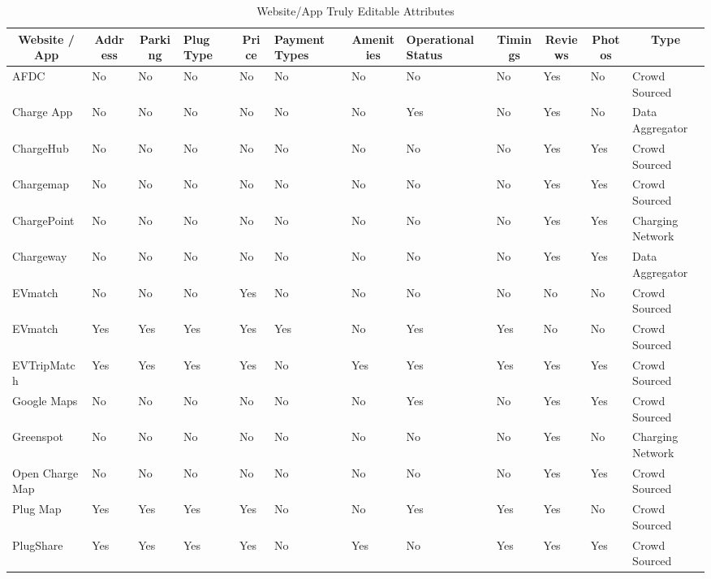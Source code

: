 \documentclass[conference]{IEEEtran}
\begin{document}
\begin{table}[htbp]
\caption{Website/App Truly Editable Attributes}
\begin{center}
\begin{tabular}{|l|l|l|l|l|l|l|l|l|l|l|l|}
\hline
\multicolumn{1}{|c|}{\textbf{Website / App}} & \multicolumn{1}{c|}{\textbf{Address}} & \multicolumn{1}{c|}{\textbf{Parking}} & \multicolumn{1}{p{0.1\columnwidth}|}{\textbf{Plug Type}} & \multicolumn{1}{c|}{\textbf{Price}} & \multicolumn{1}{p{0.12\columnwidth}|}{\textbf{Payment Types}} & \multicolumn{1}{c|}{\textbf{Amenities}} & \multicolumn{1}{p{0.16\columnwidth}|}{\textbf{Operational Status}} & \multicolumn{1}{c|}{\textbf{Timings}} & \multicolumn{1}{c|}{\textbf{Reviews}} & \multicolumn{1}{c|}{\textbf{Photos}} & \multicolumn{1}{c|}{\textbf{Type}}  \\ \hline
AFDC & No & No & No & No & No & No & No & No & Yes & No & Crowd Sourced \\
Charge   App & No & No & No & No & No & No & Yes & No & Yes & No & Data Aggregator \\
ChargeHub & No & No & No & No & No & No & No & No & Yes & Yes & Crowd Sourced \\
Chargemap & No & No & No & No & No & No & No & No & Yes & Yes & Crowd Sourced \\
ChargePoint & No & No & No & No & No & No & No & No & Yes & Yes & Charging Network \\
Chargeway & No & No & No & No & No & No & No & No & Yes & Yes & Data Aggregator \\
EVmatch & No & No & No & Yes & No & No & No & No & No & No & Crowd Sourced \\
EVmatch & Yes & Yes & Yes & Yes & Yes & No & Yes & Yes & No & No & Crowd Sourced \\
EVTripMatch & Yes & Yes & Yes & Yes & No & Yes & Yes & Yes & Yes & Yes & Crowd Sourced \\
Google   Maps & No & No & No & No & No & No & Yes & No & Yes & Yes & Crowd Sourced \\
Greenspot & No & No & No & No & No & No & No & No & Yes & No & Charging Network \\
\begin{minipage}[t]{0.17\columnwidth}%
Open Charge Map %
\end{minipage} & No & No & No & No & No & No & No & No & Yes & Yes & Crowd Sourced \\
Plug   Map & Yes & Yes & Yes & Yes & No & No & Yes & Yes & Yes & No & Crowd Sourced \\
PlugShare & Yes & Yes & Yes & Yes & No & Yes & No & Yes & Yes & Yes & Crowd Sourced \\ \hline
\end{tabular}
\label{tab8}
\end{center}
\end{table}
\end{document}
